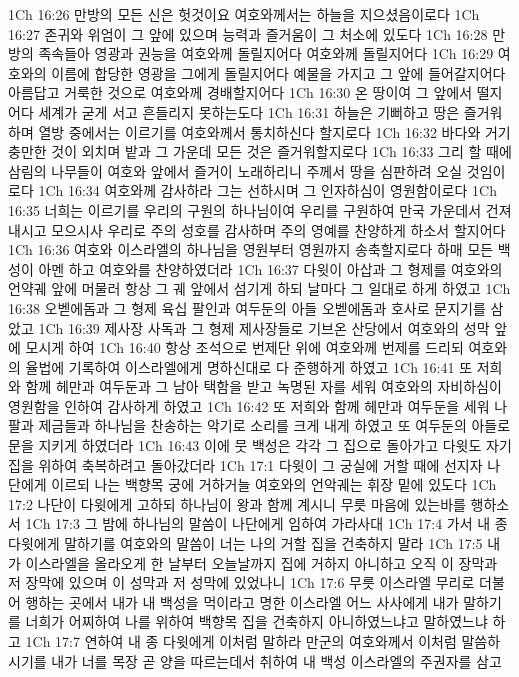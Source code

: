 1Ch 16:26  만방의 모든 신은 헛것이요 여호와께서는 하늘을 지으셨음이로다
1Ch 16:27  존귀와 위엄이 그 앞에 있으며 능력과 즐거움이 그 처소에 있도다
1Ch 16:28  만방의 족속들아 영광과 권능을 여호와께 돌릴지어다 여호와께 돌릴지어다
1Ch 16:29  여호와의 이름에 합당한 영광을 그에게 돌릴지어다 예물을 가지고 그 앞에 들어갈지어다 아름답고 거룩한 것으로 여호와께 경배할지어다
1Ch 16:30  온 땅이여 그 앞에서 떨지어다 세계가 굳게 서고 흔들리지 못하는도다
1Ch 16:31  하늘은 기뻐하고 땅은 즐거워하며 열방 중에서는 이르기를 여호와께서 통치하신다 할지로다
1Ch 16:32  바다와 거기 충만한 것이 외치며 밭과 그 가운데 모든 것은 즐거워할지로다
1Ch 16:33  그리 할 때에 삼림의 나무들이 여호와 앞에서 즐거이 노래하리니 주께서 땅을 심판하려 오실 것임이로다
1Ch 16:34  여호와께 감사하라 그는 선하시며 그 인자하심이 영원함이로다
1Ch 16:35  너희는 이르기를 우리의 구원의 하나님이여 우리를 구원하여 만국 가운데서 건져 내시고 모으시사 우리로 주의 성호를 감사하며 주의 영예를 찬양하게 하소서 할지어다
1Ch 16:36  여호와 이스라엘의 하나님을 영원부터 영원까지 송축할지로다 하매 모든 백성이 아멘 하고 여호와를 찬양하였더라
1Ch 16:37  다윗이 아삽과 그 형제를 여호와의 언약궤 앞에 머물러 항상 그 궤 앞에서 섬기게 하되 날마다 그 일대로 하게 하였고
1Ch 16:38  오벧에돔과 그 형제 육십 팔인과 여두둔의 아들 오벧에돔과 호사로 문지기를 삼았고
1Ch 16:39  제사장 사독과 그 형제 제사장들로 기브온 산당에서 여호와의 성막 앞에 모시게 하여
1Ch 16:40  항상 조석으로 번제단 위에 여호와께 번제를 드리되 여호와의 율법에 기록하여 이스라엘에게 명하신대로 다 준행하게 하였고
1Ch 16:41  또 저희와 함께 헤만과 여두둔과 그 남아 택함을 받고 녹명된 자를 세워 여호와의 자비하심이 영원함을 인하여 감사하게 하였고
1Ch 16:42  또 저희와 함께 헤만과 여두둔을 세워 나팔과 제금들과 하나님을 찬송하는 악기로 소리를 크게 내게 하였고 또 여두둔의 아들로 문을 지키게 하였더라
1Ch 16:43  이에 뭇 백성은 각각 그 집으로 돌아가고 다윗도 자기 집을 위하여 축복하려고 돌아갔더라
1Ch 17:1  다윗이 그 궁실에 거할 때에 선지자 나단에게 이르되 나는 백향목 궁에 거하거늘 여호와의 언악궤는 휘장 밑에 있도다
1Ch 17:2  나단이 다윗에게 고하되 하나님이 왕과 함께 계시니 무릇 마음에 있는바를 행하소서
1Ch 17:3  그 밤에 하나님의 말씀이 나단에게 임하여 가라사대
1Ch 17:4  가서 내 종 다윗에게 말하기를 여호와의 말씀이 너는 나의 거할 집을 건축하지 말라
1Ch 17:5  내가 이스라엘을 올라오게 한 날부터 오늘날까지 집에 거하지 아니하고 오직 이 장막과 저 장막에 있으며 이 성막과 저 성막에 있었나니
1Ch 17:6  무릇 이스라엘 무리로 더불어 행하는 곳에서 내가 내 백성을 먹이라고 명한 이스라엘 어느 사사에게 내가 말하기를 너희가 어찌하여 나를 위하여 백향목 집을 건축하지 아니하였느냐고 말하였느냐 하고
1Ch 17:7  연하여 내 종 다윗에게 이처럼 말하라 만군의 여호와께서 이처럼 말씀하시기를 내가 너를 목장 곧 양을 따르는데서 취하여 내 백성 이스라엘의 주권자를 삼고
